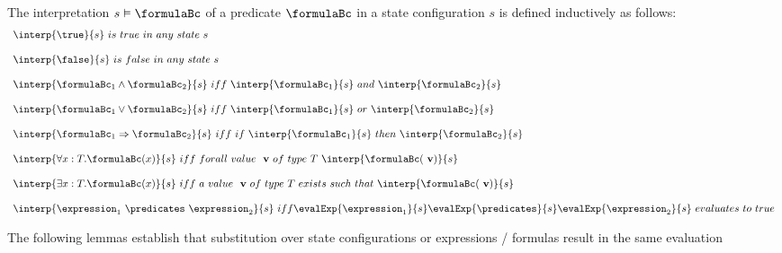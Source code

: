 \begin{interpPred} \label{interpPred} 
The interpretation $ s \vDash \formulaBc$ of a predicate $\formulaBc$ in a state configuration $s$ is defined inductively as follows:
$$
\begin{array}{l}
\interp{\true}{s} \  is \ true \ in \ any \ state \ s \\
\\
\interp{\false}{s} \ is \ false \ in \ any \ state \ s \\
\\

\interp{\formulaBc_1  \wedge  \formulaBc_2 }{s} \ iff \ \interp{\formulaBc_1}{s} \ and \ \interp{\formulaBc_2}{s}  \\
\\

\interp{\formulaBc_1  \vee  \formulaBc_2 }{s} \ iff \ \interp{\formulaBc_1}{s} \ or \ \interp{\formulaBc_2}{s}  \\
\\
\interp{\formulaBc_1  \Rightarrow  \formulaBc_2 }{s} \ iff \ if \ \interp{\formulaBc_1}{s} \ then \ \interp{\formulaBc_2}{s}  \\
\\
\interp{\forall x : T .  \formulaBc(x)   }{s} \ iff \ forall \ value \ \mbox{ \rm \textbf{v}} \ of \  type \  T \ \interp{\formulaBc(\mbox{ \rm \textbf{v}})}{s}  \\
\\

\interp{\exists x : T .  \formulaBc(x)   }{s} \ iff \ a \ value \ \mbox{ \rm \textbf{v}} \ of \  type \  T \ exists \ such \ that \ \interp{\formulaBc(\mbox{ \rm \textbf{v}})}{s}  \\
\\
\interp{\expression_1 \  \predicates \  \expression_2 }{s} \ iff \evalExp{\expression_1 }{s} \evalExp{\predicates }{s}  \evalExp{\expression_2 }{s} \ evaluates \ to \ true
\end{array}
$$   
\end{interpPred}


The following lemmas establish that substitution over state configurations or expressions / formulas result in the same evaluation

